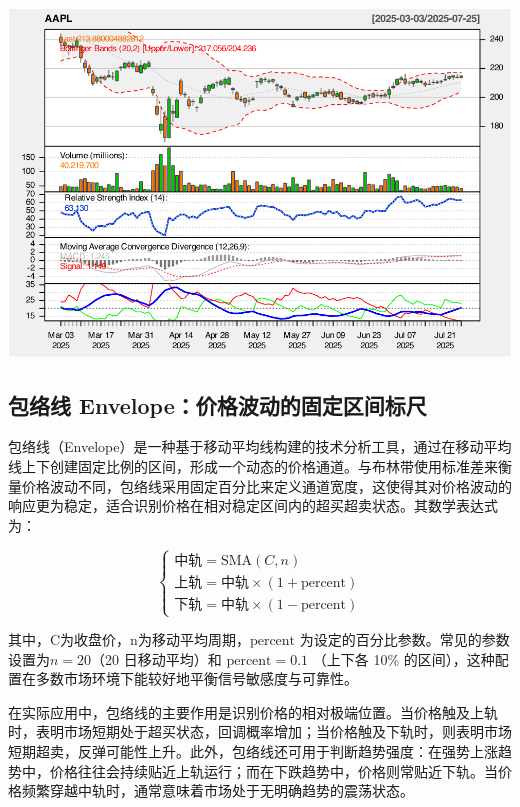 \documentclass[]{ctexbook}
\begin{document}
\includegraphics[width=0.9\linewidth]{QuantmodHandbook_files/figure-latex/bb_2-5}

\subsection{包络线 Envelope：价格波动的固定区间标尺}\label{ux5305ux7edcux7ebf-envelopeux4ef7ux683cux6ce2ux52a8ux7684ux56faux5b9aux533aux95f4ux6807ux5c3a}

包络线（Envelope）是一种基于移动平均线构建的技术分析工具，通过在移动平均线上下创建固定比例的区间，形成一个动态的价格通道。与布林带使用标准差来衡量价格波动不同，包络线采用固定百分比来定义通道宽度，这使得其对价格波动的响应更为稳定，适合识别价格在相对稳定区间内的超买超卖状态。其数学表达式为：

\[
\begin{cases}
\text{中轨} = \text{SMA}(C, n) \\
\text{上轨} = \text{中轨} \times (1 + \text{percent}) \\
\text{下轨} = \text{中轨} \times (1 - \text{percent})
\end{cases}
\]

其中，C为收盘价，n为移动平均周期，\(\text{percent}\) 为设定的百分比参数。常见的参数设置为\(n=20\)（20 日移动平均）和 \(\text{percent}=0.1\) （上下各 10\% 的区间），这种配置在多数市场环境下能较好地平衡信号敏感度与可靠性。

在实际应用中，包络线的主要作用是识别价格的相对极端位置。当价格触及上轨时，表明市场短期处于超买状态，回调概率增加；当价格触及下轨时，则表明市场短期超卖，反弹可能性上升。此外，包络线还可用于判断趋势强度：在强势上涨趋势中，价格往往会持续贴近上轨运行；而在下跌趋势中，价格则常贴近下轨。当价格频繁穿越中轨时，通常意味着市场处于无明确趋势的震荡状态。
\end{document}
